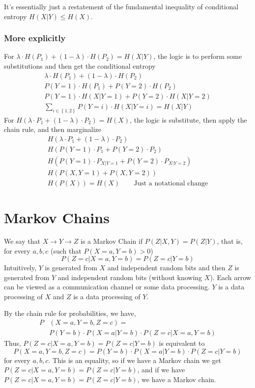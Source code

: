\documentclass{article}
\begin{document}
It's essentially just a restatement of the fundamental inequality of conditional entropy $H(X|Y)\leq H(X)$.

\subsubsection{More explicitly}

For $\lambda\cdot H(P_1) + \left(1-\lambda\right) \cdot H(P_2)=H(X|Y)$, the logic is to perform some substitutions and then get the conditional entropy 
\begin{gather*}
    \lambda\cdot H(P_1) + \left(1-\lambda\right) \cdot H(P_2)\\
    P(Y=1)\cdot H(P_1)+ P(Y=2) \cdot H(P_2)\\
    P(Y=1)\cdot H(X|Y=1)+ P(Y=2) \cdot H(X|Y=2)\\
    \sum_{i\in \left\{1,2\right\}}P(Y=i)\cdot H(X|Y=i)=H(X|Y)
\end{gather*}
For $H(\lambda\cdot P_1 + \left(1-\lambda\right)\cdot P_2)=H(X)$, the logic is substitute, then apply the chain rule, and then marginalize
\begin{gather*}
    H(\lambda\cdot P_1 + \left(1-\lambda\right)\cdot P_2)\\
    H(P(Y=1) \cdot P_1 + P(Y=2)\cdot P_2)\\
    H(P(Y=1) \cdot P_{X|Y=1} + P(Y=2)\cdot P_{X|Y=2})\\
    H\left(P(X,Y=1)+P(X,Y=2)\right)\\
    H\left(P(X)\right)=H(X) \qquad\text{Just a notational change}
\end{gather*}

\section{Markov Chains}

We say that $X\to Y\to Z$ is a Markov Chain if $P(Z|X,Y)=P(Z|Y)$, that is, for every $a,b,c$ (such that $P(X=a,Y=b)>0$)
\[
P(Z=c|X=a,Y=b)=P(Z=c|Y=b)
\]
Intuitively, $Y$ is generated from $X$ and independent random bits and then $Z$ is generated from $Y$ and independent random bits (without knowing $X$). Each arrow can be viewed as a communication channel or some data processing. $Y$ is a data processing of $X$ and $Z$ is a data processing of $Y$.

By the chain rule for probabilities, we have,
\begin{align*}
    P&(X=a,Y=b,Z=c)=\\
    & P(Y=b)\cdot P(X=a|Y=b)\cdot P(Z=c|X=a,Y=b)
\end{align*}
Thus, $P(Z=c|X=a,Y=b)=P(Z=c|Y=b)$ is equivalent to 
\[
P(X=a,Y=b,Z=c)=P(Y=b)\cdot P(X=a|Y=b)\cdot P(Z=c|Y=b)
\]
for every $a,b,c$. This is an equality, so if we have a Markov chain we get $P(Z=c|X=a,Y=b)=P(Z=c|Y=b)$, and if we have $P(Z=c|X=a,Y=b)=P(Z=c|Y=b)$, we have a Markov chain.
\end{document}
